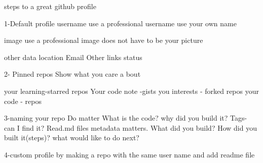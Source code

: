 steps to a great github profile 

1-Default profile 
  username
    use a professional username 
    use your own name 

  image
    use a professional image 
    does not have to be your picture 

  other data 
    location 
    Email 
    Other links 
    status 

2- Pinned repos 
  Show what you care a bout 

  your learning-starred repos 
  Your code note -gists 
  you interests - forked repos 
  your code - repos 


3-naming your repo 
  Do matter 
    What is the code?
    why did you build it?
    Tags- can I find it?
  Read.md files
    metadata matters. 
    What did you build?
    How did you built it(steps)?
    what would like to do next?

4-custom profile
  by making a repo with the same user name and add readme file 